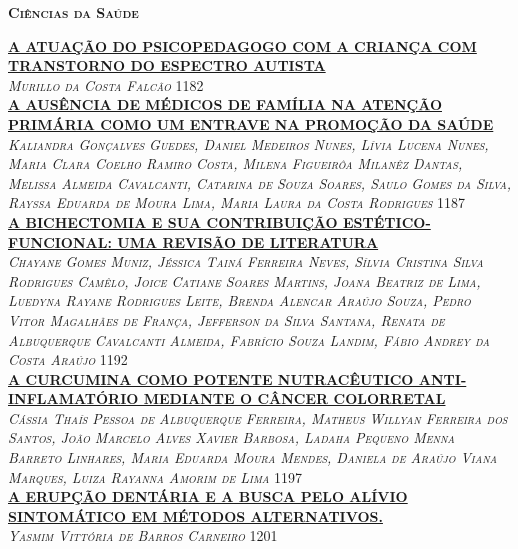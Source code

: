 \vspace*{2cm} 
\noindent \textsc{\textbf{\LARGE Ciências da Saúde}}\\ 
\vspace*{1cm} 

\noindent \textsc{\hyperlink{trabalhos/250341.pdf.1}{\textbf{A ATUAÇÃO DO PSICOPEDAGOGO COM A CRIANÇA COM TRANSTORNO DO ESPECTRO AUTISTA}}}\\ 
\noindent \textsc{\textit{Murillo da Costa Falcão}} \hfill 1182\\ 

\noindent \textsc{\hyperlink{trabalhos/251789.pdf.1}{\textbf{A AUSÊNCIA DE MÉDICOS DE FAMÍLIA NA ATENÇÃO PRIMÁRIA COMO UM ENTRAVE NA PROMOÇÃO DA SAÚDE}}}\\ 
\noindent \textsc{\textit{Kaliandra Gonçalves Guedes, Daniel Medeiros Nunes, Lívia Lucena Nunes, Maria Clara Coelho Ramiro Costa, Milena Figueirôa Milanêz Dantas, Melissa Almeida Cavalcanti, Catarina de Souza Soares, Saulo Gomes da Silva, Rayssa Eduarda de Moura Lima, Maria Laura da Costa Rodrigues}} \hfill 1187\\ 

\noindent \textsc{\hyperlink{trabalhos/250550.pdf.1}{\textbf{A BICHECTOMIA E SUA CONTRIBUIÇÃO ESTÉTICO-FUNCIONAL: UMA REVISÃO DE LITERATURA}}}\\ 
\noindent \textsc{\textit{Chayane Gomes Muniz, Jéssica Tainá Ferreira Neves, Sílvia Cristina Silva Rodrigues Camêlo, Joice Catiane Soares Martins, Joana Beatriz de Lima, Luedyna Rayane Rodrigues Leite, Brenda Alencar Araújo Souza, Pedro Vitor Magalhães de França, Jefferson da Silva Santana, Renata de Albuquerque Cavalcanti Almeida, Fabrício Souza Landim, Fábio Andrey da Costa Araújo}} \hfill 1192\\ 

\noindent \textsc{\hyperlink{trabalhos/251823.pdf.1}{\textbf{A CURCUMINA COMO POTENTE NUTRACÊUTICO ANTI-INFLAMATÓRIO MEDIANTE O CÂNCER COLORRETAL}}}\\ 
\noindent \textsc{\textit{Cássia Thaís Pessoa de Albuquerque Ferreira, Matheus Willyan Ferreira dos Santos, João Marcelo Alves Xavier Barbosa, Ladaha Pequeno Menna Barreto Linhares, Maria Eduarda Moura Mendes, Daniela de Araújo Viana Marques, Luiza Rayanna Amorim de Lima}} \hfill 1197\\ 

\noindent \textsc{\hyperlink{trabalhos/251418.pdf.1}{\textbf{A ERUPÇÃO DENTÁRIA E A BUSCA PELO ALÍVIO SINTOMÁTICO EM MÉTODOS ALTERNATIVOS.}}}\\ 
\noindent \textsc{\textit{Yasmim Vittória de Barros Carneiro}} \hfill 1201\\ 

